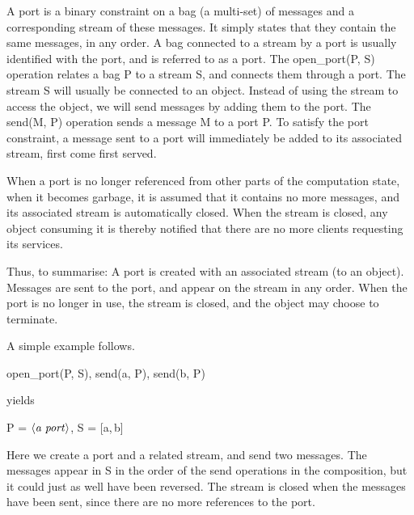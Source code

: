 A port is a binary constraint on a bag (a multi-set) of messages and a
corresponding stream of these messages.  It simply states that they
contain the same messages, in any order.  A bag connected to a stream
by a port is usually identified with the port, and is referred to as a
port.  The {\prog open_port(P, S)} operation relates a bag {\prog P}
to a stream {\prog S}, and connects them through a port.  The stream
{\prog S} will usually be connected to an object.  Instead of using
the stream to access the object, we will send messages by adding them
to the port.  The {\prog send(M, P)} operation sends a message {\prog
M} to a port {\prog P}.  To satisfy the port constraint, a message
sent to a port will immediately be added to its associated stream,
first come first served.

When a port is no longer referenced from other parts of the
computation state, when it becomes garbage, it is assumed that it
contains no more messages, and its associated stream is automatically
closed.  When the stream is closed, any object consuming it is thereby
notified that there are no more clients requesting its services.

Thus, to summarise: A port is created with an associated stream (to an
object).  Messages are sent to the port, and appear on the stream in
any order.  When the port is no longer in use, the stream is closed,
and the object may choose to terminate.

A simple example follows.
%
\begin{progex}
open_port(P, S), send(a, P), send(b, P)
\end{progex}%
%
yields
%
\begin{progex}
P = $\nt{a port}$, S = [a,\,b]
\end{progex}%
%
Here we create a port and a related stream, and send two messages.  The
messages appear in {\prog S} in the order of the send operations in the
composition, but it could just as well have been reversed.  The stream
is closed when the messages have been sent, since there are no more
references to the port.


